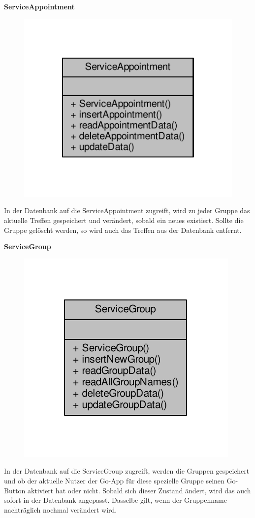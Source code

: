 \textbf{ServiceAppointment}
\begin{figure}[H]
	\includegraphics[scale = 1]{res/umlClasses/service_appointment__coll__graph.pdf}
	\centering
\end{figure}
In der Datenbank auf die ServiceAppointment zugreift, wird zu jeder Gruppe das aktuelle Treffen gespeichert und verändert, sobald ein neues existiert. 
Sollte die Gruppe gelöscht werden, so wird auch das Treffen aus der Datenbank entfernt.

\textbf{ServiceGroup}
\begin{figure}[H]
	\includegraphics[scale = 1]{res/umlClasses/service_group__coll__graph.pdf}
	\centering
\end{figure}
In der Datenbank auf die ServiceGroup zugreift, werden die Gruppen gespeichert und ob der aktuelle Nutzer der Go-App für diese spezielle Gruppe seinen Go-Button aktiviert hat oder nicht. Sobald sich dieser Zustand ändert, wird das auch sofort in der Datenbank angepasst. Dasselbe gilt, wenn der Gruppenname nachträglich nochmal verändert wird.

